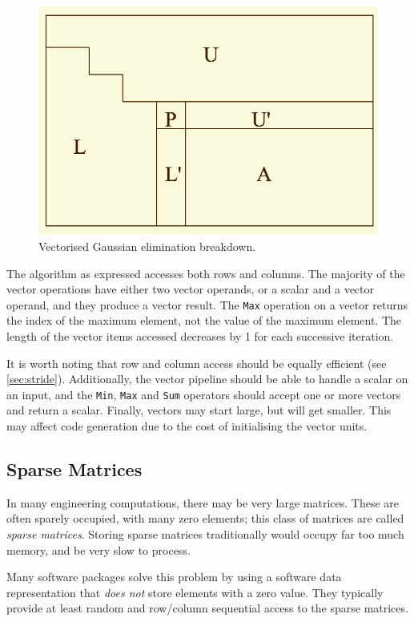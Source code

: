 \begin{figure}
\centering
\includegraphics[width=0.7\linewidth]{screenshot086}
\caption{Vectorised Gaussian elimination \footnotemark breakdown.}
\label{fig:screenshot086}
\end{figure}

The algorithm as expressed accesses both rows and columns. The majority of the vector operations have either two vector operands, or a scalar and a vector operand, and they produce a vector result. The \texttt{Max} operation on a vector returns the index of the maximum element, not the value of the maximum element. The length of the vector items accessed decreases by 1 for each successive iteration. 

It is worth noting that row and column access should be equally efficient (see \autoref{sec:stride}). Additionally, the vector pipeline should be able to handle a scalar on an input, and the \texttt{Min}, \texttt{Max} and \texttt{Sum} operators should accept one or more vectors and return a scalar. Finally, vectors may start large, but will get smaller. This may affect code generation due to the cost of initialising the vector units.

\subsection{Sparse Matrices}
In many engineering computations, there may be very large matrices. These are often sparely occupied, with many zero elements; this class of matrices are called \textit{sparse matrices}. Storing sparse matrices traditionally would occupy far too much memory, and be very slow to process.

Many software packages solve this problem by using a software data representation that \textit{does not} store elements with a zero value. They typically provide at least random and row/column sequential access to the sparse matrices.

